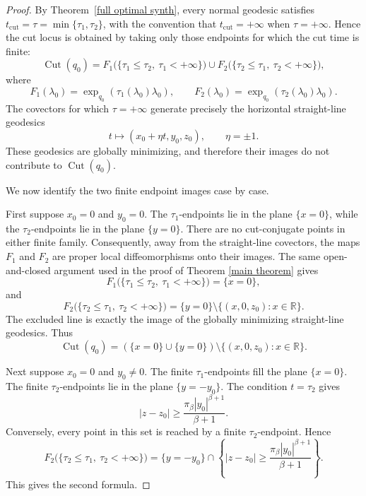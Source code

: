 \documentclass[12pt]{amsart}
\numberwithin{equation}{section}
\theoremstyle{plain}
\theoremstyle{definition}
\theoremstyle{remark}
\begin{document}
\begin{proof}
    By Theorem~\ref{full optimal synth}, every normal geodesic satisfies
    \(t_{\mathrm{cut}}=\tau=\min\{\tau_1,\tau_2\}\), with the convention that
    \(t_{\mathrm{cut}}=+\infty\) when \(\tau=+\infty\). Hence the cut locus is obtained by taking
    only those endpoints for which the cut time is finite:
    \[
        \operatorname{Cut}(q_0)
        =
        F_1\bigl(\{\tau_1\leq \tau_2,\ \tau_1<+\infty\}\bigr)
        \cup
        F_2\bigl(\{\tau_2\leq \tau_1,\ \tau_2<+\infty\}\bigr),
    \]
    where
    \[
        F_1(\lambda_0)=\exp_{q_0}(\tau_1(\lambda_0)\lambda_0),
        \qquad
        F_2(\lambda_0)=\exp_{q_0}(\tau_2(\lambda_0)\lambda_0).
    \]
    The covectors for which \(\tau=+\infty\) generate precisely the horizontal straight-line
    geodesics
    \[
        t\longmapsto (x_0+\eta t,y_0,z_0),\qquad \eta=\pm1.
    \]
    These geodesics are globally minimizing, and therefore their images do not contribute to
    \(\operatorname{Cut}(q_0)\).

    We now identify the two finite endpoint images case by case.

    First suppose \(x_0=0\) and \(y_0=0\). The \(\tau_1\)-endpoints lie in the plane
    \(\{x=0\}\), while the \(\tau_2\)-endpoints lie in the plane \(\{y=0\}\). There are no
    cut-conjugate points in either finite family. Consequently, away from the straight-line
    covectors, the maps \(F_1\) and \(F_2\) are proper local diffeomorphisms onto their images.
    The same open-and-closed argument used in the proof of Theorem \ref{main theorem} gives
    \[
        F_1\bigl(\{\tau_1\leq \tau_2,\ \tau_1<+\infty\}\bigr)=\{x=0\},
    \]
    and
    \[
        F_2\bigl(\{\tau_2\leq \tau_1,\ \tau_2<+\infty\}\bigr)
        =
        \{y=0\}\setminus\{(x,0,z_0):x\in\mathbb R\}.
    \]
    The excluded line is exactly the image of the globally minimizing straight-line geodesics.
    Thus
    \[
        \operatorname{Cut}(q_0)
        =
        (\{x=0\}\cup\{y=0\})
        \setminus
        \{(x,0,z_0):x\in\mathbb R\}.
    \]

    Next suppose \(x_0=0\) and \(y_0\neq0\). The finite \(\tau_1\)-endpoints fill the plane
    \(\{x=0\}\). The finite \(\tau_2\)-endpoints lie in the plane \(\{y=-y_0\}\). The condition
    \(t=\tau_2\) gives
    \[
        |z-z_0|\geq \frac{\pi_\beta |y_0|^{\beta+1}}{\beta+1}.
    \]
    Conversely, every point in this set is reached by a finite \(\tau_2\)-endpoint. Hence
    \[
        F_2\bigl(\{\tau_2\leq \tau_1,\ \tau_2<+\infty\}\bigr)
        =
        \{y=-y_0\}
        \cap
        \left\{
        |z-z_0|
        \geq
        \frac{\pi_\beta |y_0|^{\beta+1}}{\beta+1}
        \right\}.
    \]
    This gives the second formula.


\end{proof}
\end{document}
